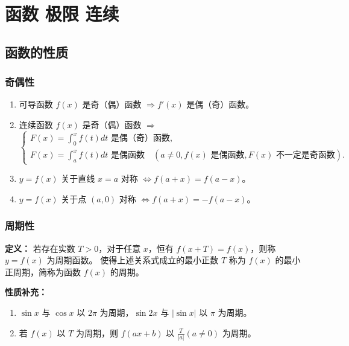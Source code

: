\documentclass[a4paper,12pt]{ctexart}
\newenvironment{purplebox}
  {\begin{tcolorbox}[colback=white, colframe=boxpurple, boxrule=1pt, sharp corners, title=\textbf{定义/定理/核心公式}]}
  {\end{tcolorbox}}
\newcommand{\zh}[1]{\par\smallskip\noindent\textbf{#1}\par\smallskip}
\begin{document}
\section{函数 极限 连续}

\subsection{函数的性质}

\subsubsection{奇偶性}
\begin{enumerate}
    \item 可导函数 $f(x)$ 是奇（偶）函数 $\Rightarrow f'(x)$ 是偶（奇）函数。
    \item 连续函数 $f(x)$ 是奇（偶）函数 $\Rightarrow$
    \[
    \begin{cases}
    F(x) = \int_0^x f(t) dt \text{ 是偶（奇）函数}, \\
    F(x) = \int_a^x f(t) dt \text{ 是偶函数} \quad (a \neq 0, f(x) \text{ 是偶函数}, F(x) \text{ 不一定是奇函数}).
    \end{cases}
    \]
    \item $y = f(x)$ 关于直线 $x = a$ 对称 $\Leftrightarrow f(a+x) = f(a-x)$。
    \item $y = f(x)$ 关于点 $(a, 0)$ 对称 $\Leftrightarrow f(a+x) = -f(a-x)$。
\end{enumerate}

\subsubsection{周期性}
\begin{purplebox}
    \textbf{定义：} 若存在实数 $T > 0$，对于任意 $x$，恒有 $f(x+T) = f(x)$，则称 $y = f(x)$ 为周期函数。
    使得上述关系式成立的最小正数 $T$ 称为 $f(x)$ 的最小正周期，简称为函数 $f(x)$ 的周期。
\end{purplebox}

\zh{性质补充：}
\begin{enumerate}
    \item $\sin x$ 与 $\cos x$ 以 $2\pi$ 为周期，$\sin 2x$ 与 $|\sin x|$ 以 $\pi$ 为周期。
    \item 若 $f(x)$ 以 $T$ 为周期，则 $f(ax+b)$ 以 $\frac{T}{|a|} (a \neq 0)$ 为周期。
\end{enumerate}
\end{document}

